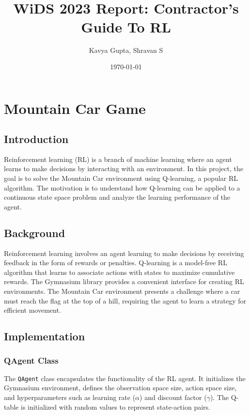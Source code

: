 \documentclass{article}
\title{WiDS 2023 Report: Contractor's Guide To RL}
\author{Kavya Gupta, Shravan S}
\date{\today}
\begin{document}
\maketitle
\clearpage
\tableofcontents
\clearpage

\section{Mountain Car Game}
\subsection{Introduction}
Reinforcement learning (RL) is a branch of machine learning where an agent learns to make decisions by interacting with an environment. In this project, the goal is to solve the Mountain Car environment using Q-learning, a popular RL algorithm. The motivation is to understand how Q-learning can be applied to a continuous state space problem and analyze the learning performance of the agent.

\subsection{Background}
Reinforcement learning involves an agent learning to make decisions by receiving feedback in the form of rewards or penalties.
Q-learning is a model-free RL algorithm that learns to associate actions with states to maximize cumulative rewards. The 
Gymnasium library provides a convenient interface for creating RL environments. The Mountain Car environment presents a 
challenge where a car must reach the flag at the top of a hill, requiring the agent to learn a strategy for efficient movement.

\subsection{Implementation}
\subsubsection{QAgent Class}
The \texttt{QAgent} class encapsulates the functionality of the RL agent. It initializes the Gymnasium environment, defines 
the observation space size, action space size, and hyperparameters such as learning rate (\(\alpha\)) and discount factor 
(\(\gamma\)). The Q-table is initialized with random values to represent state-action pairs.
\end{document}
